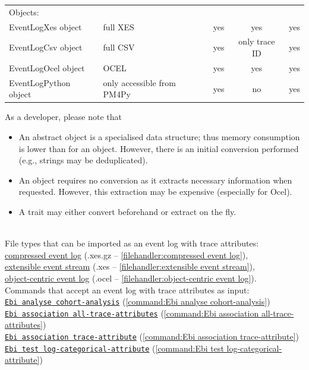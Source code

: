 {\begin{tabularx}{\linewidth}{XXccc}
            \midrule
            Objects:\\
            EventLogXes object & full XES & yes & yes & yes \\
            EventLogCsv object & full CSV & yes & only trace ID & yes \\
            EventLogOcel object & OCEL & yes & yes & yes \\
            EventLogPython object & only accessible from PM4Py & yes & no & yes \\
            \bottomrule
        \end{tabularx}
        As a developer, please note that 
        \begin{itemize}
            \item An abstract object is a specialised data structure; thus memory consumption is lower than for an object. 
            However, there is an initial conversion performed (e.g., strings may be deduplicated).
            \item An object requires no conversion as it extracts necessary information when requested.
            However, this extraction may be expensive (especially for Ocel).
            \item A trait may either convert beforehand or extract on the fly.
        \end{itemize}~
\\File types that can be imported as an event log with trace attributes: \\\null\qquad\hyperref[filehandler:compressed event log]{compressed event log} (.xes.gz -- \cref{filehandler:compressed event log}), \\\null\qquad\hyperref[filehandler:extensible event stream]{extensible event stream} (.xes -- \cref{filehandler:extensible event stream}), \\\null\qquad\hyperref[filehandler:object-centric event log]{object-centric event log} (.ocel -- \cref{filehandler:object-centric event log}).
\\Commands that accept an event log with trace attributes as input: \\\null\qquad\hyperref[command:Ebi analyse cohort-analysis]{\texttt{Ebi analyse cohort-analysis}} (\cref{command:Ebi analyse cohort-analysis})\\\null\qquad\hyperref[command:Ebi association all-trace-attributes]{\texttt{Ebi association all-trace-attributes}} (\cref{command:Ebi association all-trace-attributes})\\\null\qquad\hyperref[command:Ebi association trace-attribute]{\texttt{Ebi association trace-attribute}} (\cref{command:Ebi association trace-attribute})\\\null\qquad\hyperref[command:Ebi test log-categorical-attribute]{\texttt{Ebi test log-categorical-attribute}} (\cref{command:Ebi test log-categorical-attribute})
}
